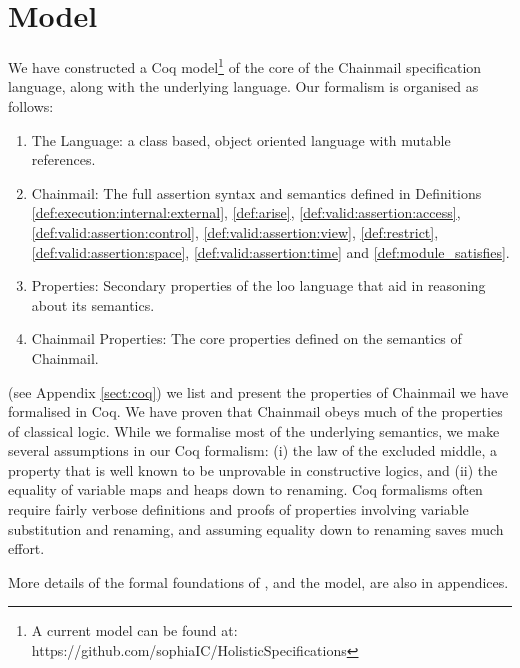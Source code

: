 \section{Model}
\label{sect:model}

We have constructed a Coq model\footnote{A current model can be found at: https://github.com/sophiaIC/HolisticSpecifications} \cite{coq} of the core of the Chainmail
specification language, along with the underlying \LangOO language.
Our formalism is organised as follows:
\begin{enumerate}
\item
The \LangOO Language: a class based, object oriented language with mutable references.
\item
Chainmail: The full assertion syntax and semantics defined in Definitions \ref{def:execution:internal:external}, \ref{def:arise}, \ref{def:valid:assertion:access}, \ref{def:valid:assertion:control}, \ref{def:valid:assertion:view}, \ref{def:restrict}, \ref{def:valid:assertion:space}, %
\ref{def:valid:assertion:time} and \ref{def:module_satisfies}.
\item
\LangOO Properties: Secondary properties of the loo language that aid in reasoning about its semantics.
\item
Chainmail Properties: The core properties defined on the semantics of Chainmail.
\end{enumerate}

 (see Appendix \ref{sect:coq}) we list and present the properties of Chainmail we have formalised in Coq.
We have proven that Chainmail obeys much of the properties of classical logic. While we formalise most of the underlying semantics, we make several assumptions in our Coq formalism: (i) the law of the excluded middle,  a property that is well known to be unprovable in constructive logics, and (ii) the equality of variable maps and heaps down to renaming. Coq formalisms often require fairly verbose definitions and proofs of properties involving variable substitution and renaming, and assuming equality down to renaming saves much effort.

More details of the formal foundations of \Chainmail, and the model,
are also in appendices.

